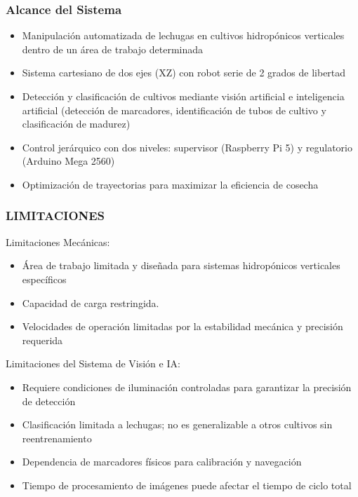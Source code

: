\subsubsection {Alcance del Sistema}
\begin{itemize}[label=\textbullet]
    \item Manipulación automatizada de lechugas en cultivos hidropónicos verticales dentro de un área de trabajo  determinada    \item Sistema cartesiano de dos ejes (XZ) con robot serie de 2 grados de libertad
    \item Detección y clasificación de cultivos mediante visión artificial e inteligencia artificial (detección de marcadores, identificación de tubos de cultivo y clasificación de madurez)
    \item Control jerárquico con dos niveles: supervisor (Raspberry Pi 5) y regulatorio (Arduino Mega 2560)
    \item Optimización de trayectorias para maximizar la eficiencia de cosecha
\end{itemize}

\subsubsection{LIMITACIONES}
Limitaciones Mecánicas:
\begin{itemize}[label=\textbullet]
    \item Área de trabajo limitada y diseñada para sistemas hidropónicos verticales específicos
    \item Capacidad de carga restringida.
    \item Velocidades de operación limitadas por la estabilidad mecánica y precisión requerida
\end{itemize}

Limitaciones del Sistema de Visión e IA:
\begin{itemize}[label=\textbullet]
    \item Requiere condiciones de iluminación controladas para garantizar la precisión de detección
    \item Clasificación limitada a lechugas; no es generalizable a otros cultivos sin reentrenamiento
    \item Dependencia de marcadores físicos para calibración y navegación
    \item Tiempo de procesamiento de imágenes puede afectar el tiempo de ciclo total
\end{itemize}

